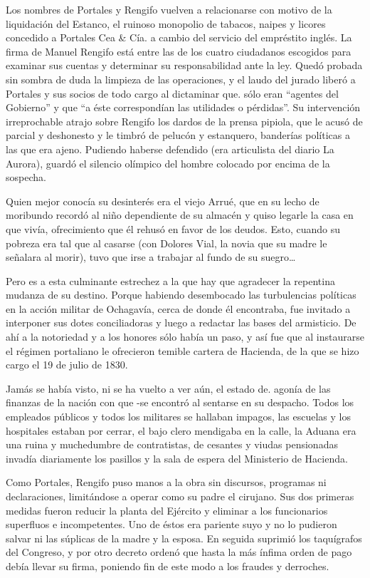 \documentclass[10pt,twoside,openright]{memoir}
\begin{document}
Los nombres de Portales y Rengifo vuelven a relacionarse con motivo de
la liquidación del Estanco, el ruinoso monopolio de tabacos, naipes y
licores concedido a Portales Cea \& Cía. a cambio del servicio del
empréstito inglés. La firma de Manuel Rengifo está entre las de los
cuatro ciudadanos escogidos para examinar sus cuentas y determinar su
responsabilidad ante la ley. Quedó probada sin sombra de duda la
limpieza de las operaciones, y el laudo del jurado liberó a Portales y
sus socios de todo cargo al dictaminar que. sólo eran ``agentes del
Gobierno'' y que ``a éste correspondían las utilidades o pérdidas''. Su
intervención irreprochable atrajo sobre Rengifo los dardos de la prensa
pipiola, que le acusó de parcial y deshonesto y le timbró de pelucón y
estanquero, banderías políticas a las que era ajeno. Pudiendo haberse
defendido (era articulista del diario La Aurora), guardó el silencio
olímpico del hombre colocado por encima de la sospecha.

Quien mejor conocía su desinterés era el viejo Arrué, que en su lecho de
moribundo recordó al niño dependiente de su almacén y quiso legarle la
casa en que vivía, ofrecimiento que él rehusó en favor de los deudos.
Esto, cuando su pobreza era tal que al casarse (con Dolores Vial, la
novia que su madre le señalara al morir), tuvo que irse a trabajar al
fundo de su suegro\ldots

Pero es a esta culminante estrechez a la que hay que agradecer la
repentina mudanza de su destino. Porque habiendo desembocado las
turbulencias políticas en la acción militar de Ochagavía, cerca de donde
él encontraba, fue invitado a interponer sus dotes conciliadoras y luego
a redactar las bases del armisticio. De ahí a la notoriedad y a los
honores sólo había un paso, y así fue que al instaurarse el régimen
portaliano le ofrecieron temible cartera de Hacienda, de la que se hizo
cargo el 19 de julio de 1830.

Jamás se había visto, ni se ha vuelto a ver aún, el estado de. agonía de
las finanzas de la nación con que -se encontró al sentarse en su
despacho. Todos los empleados públicos y todos los militares se hallaban
impagos, las escuelas y los hospitales estaban por cerrar, el bajo clero
mendigaba en la calle, la Aduana era una ruina y muchedumbre de
contratistas, de cesantes y viudas pensionadas invadía diariamente los
pasillos y la sala de espera del Ministerio de Hacienda.

Como Portales, Rengifo puso manos a la obra sin discursos, programas ni
declaraciones, limitándose a operar como su padre el cirujano. Sus dos
primeras medidas fueron reducir la planta del Ejército y eliminar a los
funcionarios superfluos e incompetentes. Uno de éstos era pariente suyo
y no lo pudieron salvar ni las súplicas de la madre y la esposa. En
seguida suprimió los taquígrafos del Congreso, y por otro decreto ordenó
que hasta la más ínfima orden de pago debía llevar su firma, poniendo
fin de este modo a los fraudes y derroches.
\end{document}
